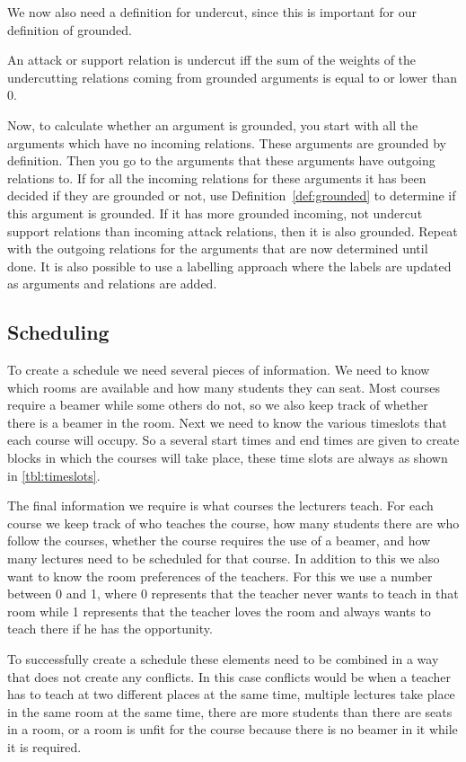 We now also need a definition for undercut, since this is important for our
definition of grounded.
\begin{defn}\label{def:undercut}
    An attack or support relation is undercut iff the sum of the weights of the
    undercutting relations coming from grounded arguments is equal to or
    lower than 0.
\end{defn}

Now, to calculate whether an argument is grounded, you start with all the
arguments which have no incoming relations. These arguments are grounded by
definition. Then you go to the arguments that these arguments have
outgoing relations to. If for all the incoming relations for these
arguments it has been decided if they are grounded or not, use 
Definition~\ref{def:grounded} to determine if this argument is grounded. If
it has more grounded incoming, not undercut support relations than incoming
attack relations, then it is also grounded. Repeat with the outgoing
relations for the arguments that are now determined until done. It is also
possible to use a labelling approach where the labels are updated as
arguments and relations are added.

\subsection{Scheduling}
To create a schedule we need several pieces of information. We need to know
which rooms are available and how many students they can seat. Most courses
require a beamer while some others do not, so we also keep track of whether
there is a beamer in the room. Next we need to know the various timeslots that
each course will occupy. So a several start times and end times are given to
create blocks in which the courses will take place, these time slots are always
as shown in \autoref{tbl:timeslots}.

The final information we require is what courses the lecturers teach. For each
course we keep track of who teaches the course, how many students there are who
follow the courses, whether the course requires the use of a beamer, and how
many lectures need to be scheduled for that course. In addition to this we also
want to know the room preferences of the teachers. For this we use a number
between 0 and 1, where 0 represents that the teacher never wants to teach in
that room while 1 represents that the teacher loves the room and always wants to
teach there if he has the opportunity.

To successfully create a schedule these elements need to be combined in a way
that does not create any conflicts. In this case conflicts would be when a
teacher has to teach at two different places at the same time, multiple lectures
take place in the same room at the same time, there are more students than there
are seats in a room, or a room is unfit for the course because there is no
beamer in it while it is required.

